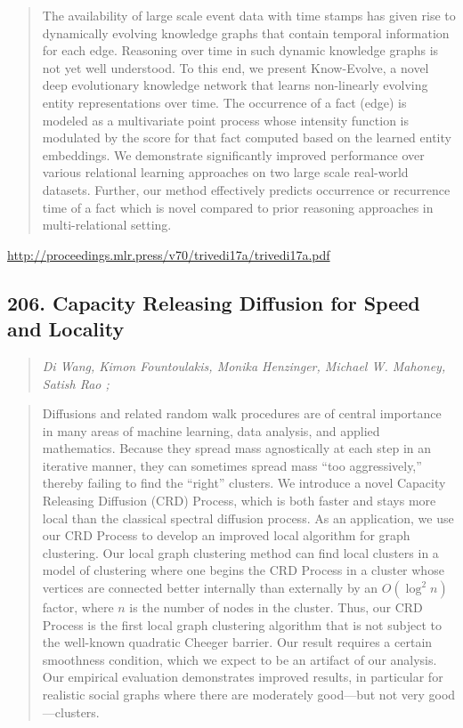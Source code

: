 \documentclass{article}
\begin{document}
\begin{quote}
    The availability of large scale event data with time stamps has given rise to dynamically evolving knowledge graphs that contain temporal information for each edge. Reasoning over time in such dynamic knowledge graphs is not yet well understood. To this end, we present Know-Evolve, a novel deep evolutionary knowledge network that learns non-linearly evolving entity representations over time. The occurrence of a fact (edge) is modeled as a multivariate point process whose intensity function is modulated by the score for that fact computed based on the learned entity embeddings. We demonstrate significantly improved performance over various relational learning approaches on two large scale real-world datasets. Further, our method effectively predicts occurrence or recurrence time of a fact which is novel compared to prior reasoning approaches in multi-relational setting.  \end{quote}

\href{http://proceedings.mlr.press/v70/trivedi17a/trivedi17a.pdf}{http://proceedings.mlr.press/v70/trivedi17a/trivedi17a.pdf}

\subsection{206. Capacity Releasing Diffusion for Speed and Locality}

\begin{quote}
\footnotesize{\textit{Di Wang, Kimon Fountoulakis, Monika Henzinger, Michael W. Mahoney, Satish Rao ;}}
\end{quote}

\begin{quote}
    Diffusions and related random walk procedures are of central importance in many areas of machine learning, data analysis, and applied mathematics. Because they spread mass agnostically at each step in an iterative manner, they can sometimes spread mass “too aggressively,” thereby failing to find the “right” clusters. We introduce a novel Capacity Releasing Diffusion (CRD) Process, which is both faster and stays more local than the classical spectral diffusion process. As an application, we use our CRD Process to develop an improved local algorithm for graph clustering. Our local graph clustering method can find local clusters in a model of clustering where one begins the CRD Process in a cluster whose vertices are connected better internally than externally by an $O(\log^2 n)$ factor, where $n$ is the number of nodes in the cluster. Thus, our CRD Process is the first local graph clustering algorithm that is not subject to the well-known quadratic Cheeger barrier. Our result requires a certain smoothness condition, which we expect to be an artifact of our analysis. Our empirical evaluation demonstrates improved results, in particular for realistic social graphs where there are moderately good—but not very good—clusters.  \end{quote}
\end{document}
